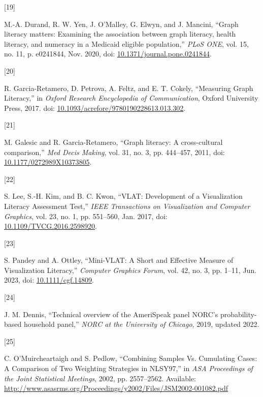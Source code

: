 \documentclass{IEEEcsmag}
\newlength{\cslhangindent}
\newlength{\csllabelwidth}
\newenvironment{CSLReferences}[2] %
 {\begin{list}{}{%
  \setlength{\itemindent}{0pt}
  \setlength{\leftmargin}{0pt}
  \setlength{\parsep}{0pt}
  \ifodd #1
   \setlength{\leftmargin}{\cslhangindent}
   \setlength{\itemindent}{-1\cslhangindent}
  \fi
  \setlength{\itemsep}{#2\baselineskip}}}
 {\end{list}}
\newcommand{\CSLLeftMargin}[1]{\parbox[t]{\csllabelwidth}{#1}}
\newcommand{\CSLRightInline}[1]{\parbox[t]{\linewidth - \csllabelwidth}{#1}\break}
\begin{document}
\begin{CSLReferences}{0}{0}
\CSLLeftMargin{{[}19{]} }%
\CSLRightInline{M.-A. Durand, R. W. Yen, J. O'Malley, G. Elwyn, and J. Mancini, {``Graph literacy matters: {Examining} the association between graph literacy, health literacy, and numeracy in a {Medicaid} eligible population,''} \emph{PLoS ONE}, vol. 15, no. 11, p. e0241844, Nov. 2020, doi: \href{https://doi.org/10.1371/journal.pone.0241844}{10.1371/journal.pone.0241844}.}

\CSLLeftMargin{{[}20{]} }%
\CSLRightInline{R. Garcia-Retamero, D. Petrova, A. Feltz, and E. T. Cokely, {``Measuring {Graph Literacy},''} in \emph{Oxford {Research Encyclopedia} of {Communication}}, Oxford University Press, 2017. doi: \href{https://doi.org/10.1093/acrefore/9780190228613.013.302}{10.1093/acrefore/9780190228613.013.302}.}

\CSLLeftMargin{{[}21{]} }%
\CSLRightInline{M. Galesic and R. Garcia-Retamero, {``Graph literacy: A cross-cultural comparison,''} \emph{Med Decis Making}, vol. 31, no. 3, pp. 444--457, 2011, doi: \href{https://doi.org/10.1177/0272989X10373805}{10.1177/0272989X10373805}.}

\CSLLeftMargin{{[}22{]} }%
\CSLRightInline{S. Lee, S.-H. Kim, and B. C. Kwon, {``{VLAT}: {Development} of a {Visualization} {Literacy} {Assessment} {Test},''} \emph{IEEE Transactions on Visualization and Computer Graphics}, vol. 23, no. 1, pp. 551--560, Jan. 2017, doi: \href{https://doi.org/10.1109/TVCG.2016.2598920}{10.1109/TVCG.2016.2598920}.}

\CSLLeftMargin{{[}23{]} }%
\CSLRightInline{S. Pandey and A. Ottley, {``Mini‐{VLAT}: {A} {Short} and {Effective} {Measure} of {Visualization} {Literacy},''} \emph{Computer Graphics Forum}, vol. 42, no. 3, pp. 1--11, Jun. 2023, doi: \href{https://doi.org/10.1111/cgf.14809}{10.1111/cgf.14809}.}

\CSLLeftMargin{{[}24{]} }%
\CSLRightInline{J. M. Dennis, {``Technical overview of the {AmeriSpeak} panel {NORC}'s probability-based household panel,''} \emph{NORC at the University of Chicago}, 2019, updated 2022.}

\CSLLeftMargin{{[}25{]} }%
\CSLRightInline{C. O'Muircheartaigh and S. Pedlow, {``Combining {Samples Vs}. {Cumulating Cases}: {A Comparison} of {Two Weighting Strategies} in {NLSY97},''} in \emph{{ASA Proceedings} of the {Joint Statistical Meetings}}, 2002, pp. 2557--2562. Available: \url{http://www.asasrms.org/Proceedings/y2002/Files/JSM2002-001082.pdf}}


\end{CSLReferences}
\end{document}
